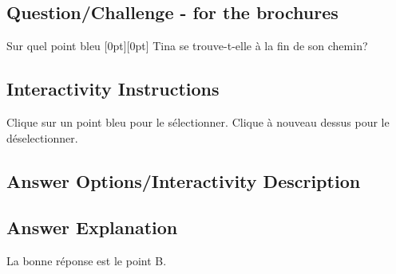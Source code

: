\documentclass[a4paper,11pt]{report}
\newcommand{\taskGraphicsFolder}{..}
\begin{document}
{\em


\subsection*{Question/Challenge - for the brochures}

Sur quel point bleu \raisebox{-0.5ex}[0pt][0pt]{} Tina se trouve-t-elle à la fin de son chemin?

{\centering%
\par}

}


\subsection*{Interactivity Instructions}

Clique sur un point bleu pour le sélectionner. Clique à nouveau dessus pour le déselectionner.

\begingroup
\renewcommand{\arraystretch}{1.5}
\subsection*{Answer Options/Interactivity Description}



\endgroup

\subsection*{Answer Explanation}

La bonne réponse est le point B.

{\centering%
\par}
\end{document}
